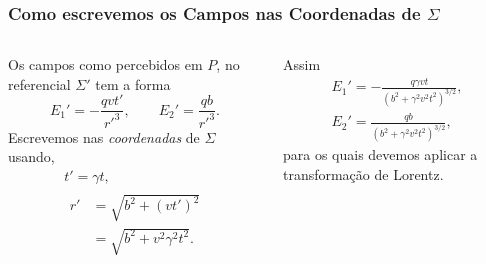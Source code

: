 \documentclass[xcolor=dvipsnames]{beamer}
\begin{document}
\begin{frame}
	\frametitle{Como escrevemos os Campos nas Coordenadas de $\Sigma$}
	\begin{columns}

		Os campos como percebidos em $P$, no referencial $\Sigma '$ tem a forma
		\begin{equation}
			E_1 ' = -\frac{qvt'}{{r'} ^3}, \qquad E_2 ' = \frac{qb}{{r'}^3}.
		\end{equation}
		Escrevemos nas \textit{coordenadas} de $\Sigma$ usando,
		\begin{gather}
			t' = \gamma t, \\
			\begin{split}
				r ' &= \sqrt{b^2 + (v t')^2} \\
					&= \sqrt{b^2 + v^2 \gamma ^2 t^2}.
			\end{split}
		\end{gather}

		Assim
		\begin{gather}
			E _1 '= - \frac{q\gamma vt}{(b^2 + \gamma ^2 v^2 t^2)^{3/2}},\\
			E _2 '= \frac{qb}{(b^2 + \gamma ^2 v^2 t^2)^{3/2}},
		\end{gather}
		para os quais devemos aplicar a transformação de Lorentz.
	\end{columns}
\end{frame}
\end{document}
